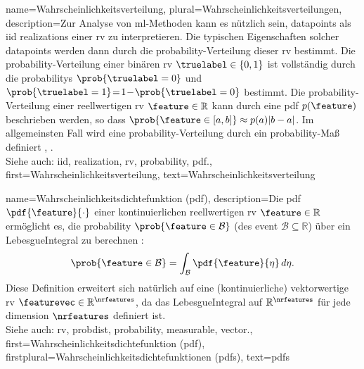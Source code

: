 {{{{
{name={Wahrscheinlichkeitsverteilung}, plural={Wahrscheinlichkeitsverteilungen},
	description={Zur Analyse von \gls{ml}-Methoden kann es nützlich sein, 
		\glspl{datapoint} als \gls{iid} \glspl{realization} einer \gls{rv} zu interpretieren. 
		Die typischen Eigenschaften solcher \glspl{datapoint} werden dann durch die 
		\gls{probability}-Verteilung dieser \gls{rv} bestimmt. 
		Die \gls{probability}-Verteilung einer binären \gls{rv} 
		$\truelabel \in \{0,1\}$ ist vollständig durch die \glspl{probability} 
		$\prob{\truelabel = 0}$ und 
		$\prob{\truelabel=1}\!=\!1\!-\!\prob{\truelabel=0}$ bestimmt. 
		Die \gls{probability}-Verteilung einer reellwertigen \gls{rv} 
		$\feature \in \mathbb{R}$ kann durch eine \gls{pdf} $p(\feature)$ beschrieben werden, 
		so dass $\prob{ \feature \in [a,b] } \approx  p(a) |b-a|$. 
	   	Im allgemeinsten Fall wird eine \gls{probability}-Verteilung durch ein 
		\gls{probability}-Maß definiert \cite{BillingsleyProbMeasure}, \cite{GrayProbBook}.
	    		\\
		Siehe auch: \gls{iid}, \gls{realization}, \gls{rv}, \gls{probability}, \gls{pdf}.},
	first={Wahrscheinlichkeitsverteilung},
	text={Wahrscheinlichkeitsverteilung}
}

{name={Wahrscheinlichkeitsdichtefunktion (pdf)},
	description={Die pdf 
	$\pdf{\feature}{\cdot}$ einer kontinuierlichen reellwertigen \gls{rv} $\feature \in \mathbb{R}$ 
	ermöglicht es, die \gls{probability} $\prob{\feature \in \mathcal{B}}$ 
	(des \gls{event} $\mathcal{B} \subseteq \mathbb{R}$)
	über ein \gls{LebesgueIntegral} zu berechnen \cite[Ch. 3]{BertsekasProb}:
	$$\prob{\feature \in \mathcal{B}} = \int_{\mathcal{B}} \pdf{\feature}{\eta} \, d\eta.$$ 
	Diese Definition erweitert sich natürlich auf eine (kontinuierliche) vektorwertige \gls{rv} 
	$\featurevec \in \mathbb{R}^{\nrfeatures}$, da das \gls{LebesgueIntegral} 
	auf $\mathbb{R}^{\nrfeatures}$ für jede \gls{dimension} $\nrfeatures$ definiert ist.
	\\
	Siehe auch: \gls{rv}, \gls{probdist}, \gls{probability}, \gls{measurable}, \gls{vector}.},
	first={Wahrscheinlichkeitsdichtefunktion (pdf)},
	firstplural={Wahrscheinlichkeitsdichtefunktionen (pdfs)},
	text={pdfs}
}

}}}}
